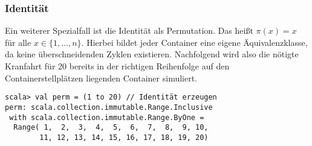 \subsubsection*{Identität}
Ein weiterer Spezialfall ist die Identität als Permutation. Das heißt $\pi(x) = x$ für alle $x \in \{1,\dots,n\}$.
Hierbei bildet jeder Container eine eigene Äquivalenzklasse, da keine überschneidenden Zyklen existieren.
Nachfolgend wird also die nötigte Kranfahrt für 20 bereits in der richtigen Reihenfolge auf den Containerstellplätzen liegenden Container simuliert.
\begin{lstlisting}
scala> val perm = (1 to 20) // Identität erzeugen
perm: scala.collection.immutable.Range.Inclusive
 with scala.collection.immutable.Range.ByOne =
  Range( 1,  2,  3,  4,  5,  6,  7,  8,  9, 10,
        11, 12, 13, 14, 15, 16, 17, 18, 19, 20)


\end{lstlisting}
